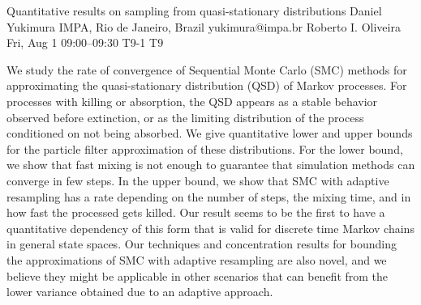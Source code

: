 \begin{talk}
  {Quantitative results on sampling from quasi-stationary distributions}%
  {Daniel Yukimura}%
  {IMPA, Rio de Janeiro, Brazil}%
  {yukimura@impa.br}%
  {Roberto I. Oliveira}%
  {}%
  {Fri, Aug 1 09:00--09:30}%
  {T9-1}%
  {T9}%
  
    
   
    We study the rate of convergence of Sequential Monte Carlo (SMC) methods for approximating the quasi-stationary distribution (QSD) of Markov processes. 
    For processes with killing or absorption, the QSD appears as a stable behavior observed before extinction, or as the limiting distribution of the process conditioned on not being absorbed. 
    We give quantitative lower and upper bounds for the particle filter approximation of these distributions.
    For the lower bound, we show that fast mixing is not enough to guarantee that simulation methods can converge in few steps.
    In the upper bound, we show that SMC with adaptive resampling has a rate depending on the number of steps, the mixing time, and in how fast the processed gets killed.
    Our result seems to be the first to have a quantitative dependency of this form that is valid for discrete time Markov chains in general state spaces.
    Our techniques and concentration results for bounding the approximations of SMC with adaptive resampling are also novel, and we believe they might be applicable in other scenarios that can benefit from the lower variance obtained due to an adaptive approach.
    
    

\medskip


\end{talk}


